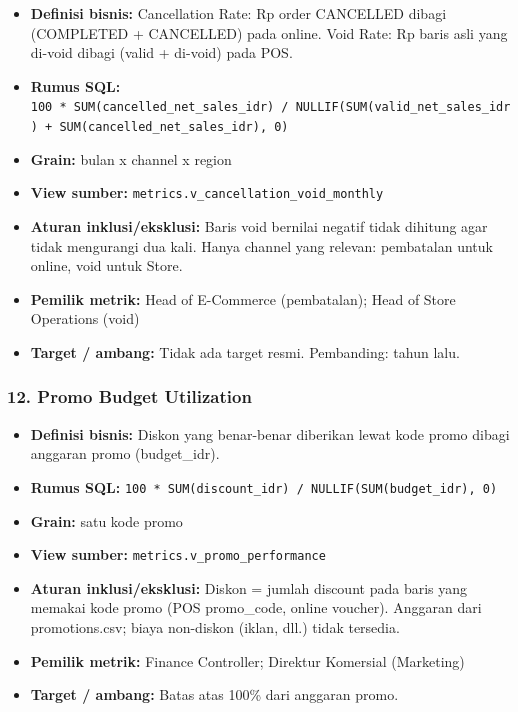 \documentclass[10pt,a4paper]{article}
\providecommand{\tightlist}{\setlength{\itemsep}{1pt}\setlength{\parskip}{0pt}}
\begin{document}
\begin{itemize}
\tightlist
\item
  \textbf{Definisi bisnis:} Cancellation Rate: Rp order CANCELLED dibagi (COMPLETED + CANCELLED) pada online. Void Rate: Rp baris asli yang di-void dibagi (valid + di-void) pada POS.
\item
  \textbf{Rumus SQL:} \texttt{100\ *\ SUM(cancelled\_\allowbreak{}net\_\allowbreak{}sales\_\allowbreak{}idr)\ /\ NULLIF(SUM(valid\_\allowbreak{}net\_\allowbreak{}sales\_\allowbreak{}idr)\ +\ SUM(cancelled\_\allowbreak{}net\_\allowbreak{}sales\_\allowbreak{}idr),\ 0)}
\item
  \textbf{Grain:} bulan x channel x region
\item
  \textbf{View sumber:} \texttt{metrics.v\_\allowbreak{}cancellation\_\allowbreak{}void\_\allowbreak{}monthly}
\item
  \textbf{Aturan inklusi/eksklusi:} Baris void bernilai negatif tidak dihitung agar tidak mengurangi dua kali. Hanya channel yang relevan: pembatalan untuk online, void untuk Store.
\item
  \textbf{Pemilik metrik:} Head of E-Commerce (pembatalan); Head of Store Operations (void)
\item
  \textbf{Target / ambang:} Tidak ada target resmi. Pembanding: tahun lalu.
\end{itemize}

\subsubsection{12. Promo Budget Utilization}\label{promo-budget-utilization}

\begin{itemize}
\tightlist
\item
  \textbf{Definisi bisnis:} Diskon yang benar-benar diberikan lewat kode promo dibagi anggaran promo (budget\_\allowbreak{}idr).
\item
  \textbf{Rumus SQL:} \texttt{100\ *\ SUM(discount\_\allowbreak{}idr)\ /\ NULLIF(SUM(budget\_\allowbreak{}idr),\ 0)}
\item
  \textbf{Grain:} satu kode promo
\item
  \textbf{View sumber:} \texttt{metrics.v\_\allowbreak{}promo\_\allowbreak{}performance}
\item
  \textbf{Aturan inklusi/eksklusi:} Diskon = jumlah discount pada baris yang memakai kode promo (POS promo\_\allowbreak{}code, online voucher). Anggaran dari promotions.csv; biaya non-diskon (iklan, dll.) tidak tersedia.
\item
  \textbf{Pemilik metrik:} Finance Controller; Direktur Komersial (Marketing)
\item
  \textbf{Target / ambang:} Batas atas 100\% dari anggaran promo.
\end{itemize}
\end{document}
